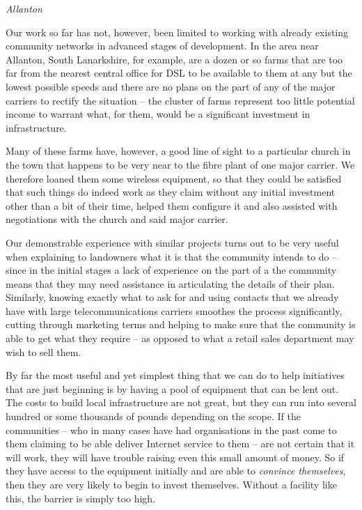 \documentclass[a4paper,conference,onecolumn]{IEEEtran}
\renewcommand{\subsection}[1]{%
  \vspace{\lineskip}%
  \begin{center}%
    \textit{#1}%
  \end{center}%
  \vspace{\lineskip}%
}
\begin{document}
\subsection{Allanton}

Our work so far has not, however, been limited to working with already
existing community networks in advanced stages of development. In the
area near Allanton, South Lanarkshire, for example, are a dozen or so
farms that are too far from the nearest central office for DSL to be
available to them at any but the lowest possible speeds and there are
no plans on the part of any of the major carriers to rectify the
situation -- the cluster of farms represent too little potential
income to warrant what, for them, would be a significant investment in
infrastructure.

Many of these farms have, however, a good line of sight
to a particular church in the town that happens to be very near to the
fibre plant of one major carrier. We therefore loaned them some
wireless equipment, so that they could be satisfied that such things
do indeed work as they claim without any initial investment other than
a bit of their time, helped them configure it and also assisted with
negotiations with the church and said major carrier.

Our demonstrable experience with similar projects turns out to be very
useful when explaining to landowners what it is that the community
intends to do -- since in the initial stages a lack of experience on
the part of a the community means that they may need assistance in
articulating the details of their plan. Similarly, knowing exactly
what to ask for and using contacts that we already have with large
telecommunications carriers smoothes the process significantly,
cutting through marketing terms and helping to make sure that the
community is able to get what they require -- as opposed to what a
retail sales department may wish to sell them.

By far the most useful and yet simplest thing that we can do to help
initiatives that are just beginning is by having a pool of equipment
that can be lent out. The costs to build local infrastructure are not
great, but they can run into several hundred or some thousands of
pounds depending on the scope. If the communities -- who in many cases
have had organisations in the past come to them claiming to be able
deliver Internet service to them -- are not certain that it will work,
they will have trouble raising even this small amount of money. So if
they have access to the equipment initially and are able to
\textit{convince themselves}, then they are very likely to begin to
invest themselves. Without a facility like this, the barrier is simply
too high.
\end{document}
